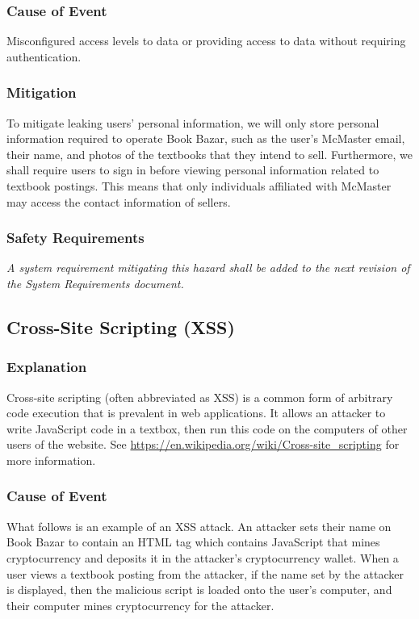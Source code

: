 \documentclass[fullpage]{article}
\begin{document}
\subsubsection*{Cause of Event}
Misconfigured access levels to data or providing access to data without requiring authentication.

\subsubsection*{Mitigation}
To mitigate leaking users’ personal information, we will only store personal information required to operate Book Bazar, such as the user’s McMaster email, their name, and photos of the textbooks that they intend to sell. Furthermore, we shall require users to sign in before viewing personal information related to textbook postings. This means that only individuals affiliated with McMaster may access the contact information of sellers.

\subsubsection*{Safety Requirements}
\emph{A system requirement mitigating this hazard shall be added to the next revision of the System Requirements document.}

\subsection{Cross-Site Scripting (XSS)}

\subsubsection*{Explanation}
Cross-site scripting (often abbreviated as XSS) is a common form of arbitrary code execution that is prevalent in web applications. It allows an attacker to write JavaScript code in a textbox, then run this code on the computers of other users of the website. See \url{https://en.wikipedia.org/wiki/Cross-site_scripting}  for more information.

\subsubsection*{Cause of Event}
What follows is an example of an XSS attack. An attacker sets their name on Book Bazar to contain an HTML tag which contains JavaScript that mines cryptocurrency and deposits it in the attacker’s cryptocurrency wallet. When a user views a textbook posting from the attacker, if the name set by the attacker is displayed, then the malicious script is loaded onto the user’s computer, and their computer mines cryptocurrency for the attacker.
\end{document}
